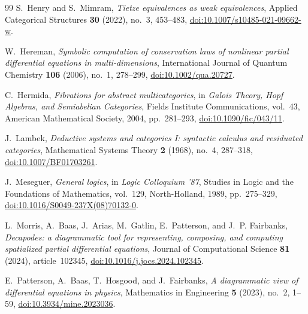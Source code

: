 \documentclass[10pt,journal,a4paper]{IEEEtran}
\theoremstyle{definition}
\begin{document}
\begin{thebibliography}{99}
S.~Henry and S.~Mimram,
\emph{Tietze equivalences as weak equivalences},
Applied Categorical Structures \textbf{30} (2022), no.~3, 453--483,
\href{https://doi.org/10.1007/s10485-021-09662-w}{doi:10.1007/s10485-021-09662-w}.

W.~Hereman,
\emph{Symbolic computation of conservation laws of nonlinear partial differential equations in multi-dimensions},
International Journal of Quantum Chemistry \textbf{106} (2006), no.~1, 278--299,
\href{https://doi.org/10.1002/qua.20727}{doi:10.1002/qua.20727}.

C.~Hermida,
\emph{Fibrations for abstract multicategories},
in \emph{Galois Theory, Hopf Algebras, and Semiabelian Categories},
Fields Institute Communications, vol.~43, American Mathematical Society, 2004, pp.~281--293,
\href{https://doi.org/10.1090/fic/043/11}{doi:10.1090/fic/043/11}.

J.~Lambek,
\emph{Deductive systems and categories I: syntactic calculus and residuated categories},
Mathematical Systems Theory \textbf{2} (1968), no.~4, 287--318,
\href{https://doi.org/10.1007/BF01703261}{doi:10.1007/BF01703261}.

\newpage
{}
J.~Meseguer,
\emph{General logics},
in \emph{Logic Colloquium '87}, Studies in Logic and the Foundations of Mathematics, vol.~129, North-Holland, 1989, pp.~275--329,
\href{https://doi.org/10.1016/S0049-237X(08)70132-0}{doi:10.1016/S0049-237X(08)70132-0}.

L.~Morris, A.~Baas, J.~Arias, M.~Gatlin, E.~Patterson, and J.~P. Fairbanks,
\emph{Decapodes: a diagrammatic tool for representing, composing, and computing spatialized partial differential equations},
Journal of Computational Science \textbf{81} (2024), article~102345,
\href{https://doi.org/10.1016/j.jocs.2024.102345}{doi:10.1016/j.jocs.2024.102345}.

E.~Patterson, A.~Baas, T.~Hosgood, and J.~Fairbanks,
\emph{A diagrammatic view of differential equations in physics},
Mathematics in Engineering \textbf{5} (2023), no.~2, 1--59,
\href{https://doi.org/10.3934/mine.2023036}{doi:10.3934/mine.2023036}.

\end{thebibliography}
\end{document}
